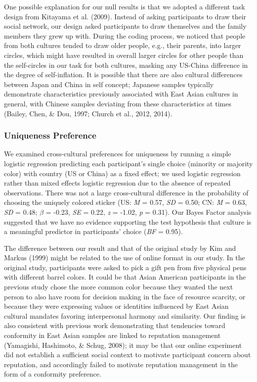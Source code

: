 \documentclass[
  man]{apa6}
\begin{document}
One possible explanation for our null results is that we adopted a different task design from Kitayama et al. (2009). Instead of asking participants to draw their social network, our design asked participants to draw themselves and the family members they grew up with. During the coding process, we noticed that people from both cultures tended to draw older people, e.g., their parents, into larger circles, which might have resulted in overall larger circles for other people than the self-circles in our task for both cultures, masking any US-China difference in the degree of self-inflation. It is possible that there are also cultural differences between Japan and China in self concept; Japanese samples typically demonstrate characteristics previously associated with East Asian cultures in general, with Chinese samples deviating from these characteristics at times (Bailey, Chen, \& Dou, 1997; Church et al., 2012, 2014).

\hypertarget{uniqueness-preference-1}{%
\subsubsection{Uniqueness Preference}\label{uniqueness-preference-1}}

We examined cross-cultural preferences for uniqueness by running a simple logistic regression predicting each participant's single choice (minority or majority color) with country (US or China) as a fixed effect; we used logistic regression rather than mixed effects logistic regression due to the absence of repeated observations. There was not a large cross-cultural difference in the probability of choosing the uniquely colored sticker (US: \emph{M} = 0.57, \emph{SD} = 0.50; CN: \emph{M} = 0.63, \emph{SD} = 0.48; \(\beta\) = -0.23, \emph{SE} = 0.22, \emph{z} = -1.02, \emph{p} = 0.31). Our Bayes Factor analysis suggested that we have no evidence supporting the test hypothesis that culture is a meaningful predictor in participants' choice (\emph{BF} = 0.95).

The difference between our result and that of the original study by Kim and Markus (1999) might be related to the use of online format in our study. In the original study, participants were asked to pick a gift pen from five physical pens with different barrel colors. It could be that Asian American participants in the previous study chose the more common color because they wanted the next person to also have room for decision making in the face of resource scarcity, or because they were expressing values or identities influenced by East Asian cultural mandates favoring interpersonal harmony and similarity. Our finding is also consistent with previous work demonstrating that tendencies toward conformity in East Asian samples are linked to reputation management (Yamagishi, Hashimoto, \& Schug, 2008); it may be that our online experiment did not establish a sufficient social context to motivate participant concern about reputation, and accordingly failed to motivate reputation management in the form of a conformity preference.
\end{document}
